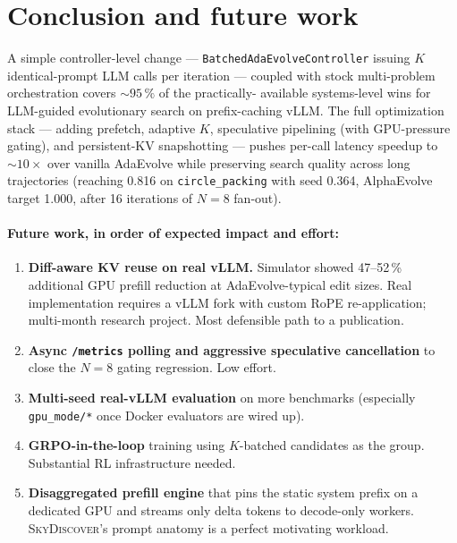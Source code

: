 \documentclass[11pt]{article}
\newcommand{\skyd}{\textsc{SkyDiscover}}
\newcommand{\adaev}{AdaEvolve}
\newcommand{\bcontroller}{\texttt{BatchedAdaEvolveController}}
\begin{document}
\section{Conclusion and future work}
\label{sec:conclusion}

A simple controller-level change --- \bcontroller{} issuing $K$
identical-prompt LLM calls per iteration --- coupled with stock
multi-problem orchestration covers $\sim 95\,\%$ of the practically-
available systems-level wins for LLM-guided evolutionary search on
prefix-caching vLLM. The full optimization stack --- adding prefetch,
adaptive $K$, speculative pipelining (with GPU-pressure gating), and
persistent-KV snapshotting --- pushes per-call latency speedup to
$\sim 10\times$ over vanilla \adaev{} while preserving search quality
across long trajectories (reaching 0.816 on \texttt{circle\_packing}
with seed 0.364, AlphaEvolve target 1.000, after 16 iterations of
$N{=}8$ fan-out).

\paragraph{Future work, in order of expected impact and effort:}
\begin{enumerate}
\item \textbf{Diff-aware KV reuse on real vLLM.} Simulator showed
  47--52\,\% additional GPU prefill reduction at AdaEvolve-typical
  edit sizes. Real implementation requires a vLLM fork with custom
  RoPE re-application; multi-month research project. Most defensible
  path to a publication.
\item \textbf{Async \texttt{/metrics} polling and aggressive
  speculative cancellation} to close the $N{=}8$ gating regression.
  Low effort.
\item \textbf{Multi-seed real-vLLM evaluation} on more benchmarks
  (especially \verb|gpu_mode/*| once Docker evaluators are wired up).
\item \textbf{GRPO-in-the-loop} training using $K$-batched candidates
  as the group. Substantial RL infrastructure needed.
\item \textbf{Disaggregated prefill engine} that pins the static
  system prefix on a dedicated GPU and streams only delta tokens to
  decode-only workers. \skyd{}'s prompt anatomy is a perfect
  motivating workload.
\end{enumerate}

\appendix
\end{document}
